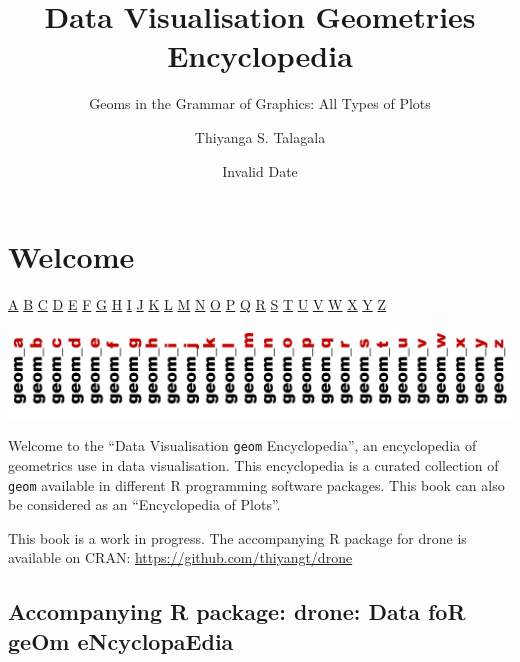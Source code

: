 \documentclass[
  letterpaper,
  DIV=11,
  numbers=noendperiod]{scrreprt}
\title{Data Visualisation {Geom}etries Encyclopedia}
\subtitle{Geoms in the Grammar of Graphics: All Types of Plots}
\author{Thiyanga S. Talagala}
\date{Invalid Date}
\renewcommand*\contentsname{Table of contents}
\newcommand\contentsname{Table of contents}
\begin{document}
\maketitle

\renewcommand*\contentsname{Table of contents}
{
\hypersetup{linkcolor=}
\setcounter{tocdepth}{2}
\tableofcontents
}


\chapter*{Welcome}\label{welcome}


\hyperref[sec-a]{A} \textbar{} \hyperref[sec-b]{B} \textbar{}
\hyperref[sec-c]{C} \textbar{} \hyperref[sec-d]{D} \textbar{}
\hyperref[sec-e]{E} \textbar{} \hyperref[sec-f]{F} \textbar{}
\hyperref[sec-g]{G} \textbar{} \hyperref[sec-h]{H} \textbar{}
\hyperref[sec-i]{I} \textbar{} \hyperref[sec-j]{J} \textbar{}
\hyperref[sec-k]{K} \textbar{} \hyperref[sec-l]{L} \textbar{}
\hyperref[sec-m]{M} \textbar{} \hyperref[sec-n]{N} \textbar{}
\hyperref[sec-o]{O} \textbar{} \hyperref[sec-p]{P} \textbar{}
\hyperref[sec-q]{Q} \textbar{} \hyperref[sec-r]{R} \textbar{}
\hyperref[sec-s]{S} \textbar{} \hyperref[sec-t]{T} \textbar{}
\hyperref[sec-u]{U} \textbar{} \hyperref[sec-v]{V} \textbar{}
\hyperref[sec-w]{W} \textbar{} \hyperref[sec-x]{X} \textbar{}
\hyperref[sec-y]{Y} \textbar{} \hyperref[sec-z]{Z} \textbar{}

\includegraphics{cover/cover.labels.png}

Welcome to the ``Data Visualisation \texttt{geom} Encyclopedia'', an
encyclopedia of geometrics use in data visualisation. This encyclopedia
is a curated collection of \texttt{geom} available in different R
programming software packages. This book can also be considered as an
``Encyclopedia of Plots''.

This book is a work in progress. The accompanying R package for drone is
available on CRAN: \url{https://github.com/thiyangt/drone}

\section*{\texorpdfstring{Accompanying R package: {drone}: {D}ata fo{R}
ge{O}m
e{N}cyclopa{E}dia}{Accompanying R package: drone: Data foR geOm eNcyclopaEdia}}\label{accompanying-r-package-drone-data-for-geom-encyclopaedia}
\end{document}
